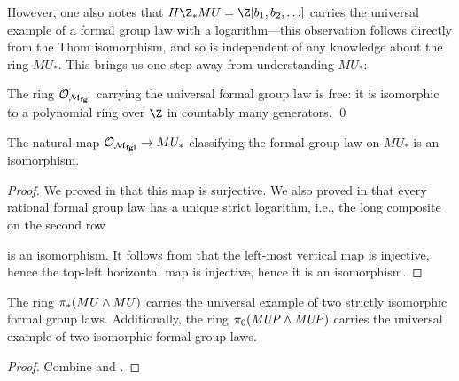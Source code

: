 However, one also notes that \(H\Z_* MU = \Z[b_1, b_2, \ldots]\) carries the universal example of a formal group law with a logarithm---this observation follows directly from the Thom isomorphism, and so is independent of any knowledge about the ring \(MU_*\).  This brings us one step away from understanding \(MU_*\):

\begin{theorem}\label{DummyLazardsThm}
The ring \(\mathcal{O}_{\mathcal{M}_{\mathbf{fgl}}}\) carrying the universal formal group law is free: it is isomorphic to a polynomial ring over \(\Z\) in countably many generators. \qed
\end{theorem}

\begin{corollary}\label{QuillensTheorem}
The natural map \(\mathcal{O}_{\mathcal{M}_{\mathbf{fgl}}} \to MU_*\) classifying the formal group law on \(MU_*\) is an isomorphism.
\end{corollary}
\begin{proof}
We proved in  that this map is surjective.  We also proved in  that every rational formal group law has a unique strict logarithm, i.e., the long composite on the second row
\begin{center}
\end{center}
is an isomorphism.  It follows from  that the left-most vertical map is injective, hence the top-left horizontal map is injective, hence it is an isomorphism.
\end{proof}

\begin{corollary}
The ring \(\pi_*(MU \wedge MU)\) carries the universal example of two strictly isomorphic formal group laws.  Additionally, the ring \(\pi_0 (\mathit{MUP} \wedge \mathit{MUP})\) carries the universal example of two isomorphic formal group laws.
\end{corollary}
\begin{proof}
Combine  and .
\end{proof}


















